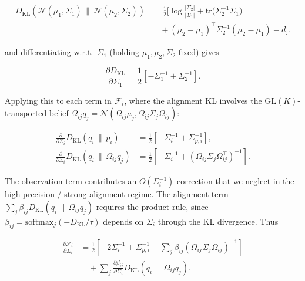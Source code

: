\documentclass[twoside,11pt]{article}
\begin{document}
\begin{align}
D_{\mathrm{KL}}\!\left(
\mathcal{N}(\mu_1, \Sigma_1)
\,\|\,
\mathcal{N}(\mu_2, \Sigma_2)
\right)
&=
\frac{1}{2}
\Big[
\log \frac{|\Sigma_2|}{|\Sigma_1|}
+ \mathrm{tr}\!\big(\Sigma_2^{-1}\Sigma_1\big)
\\ &\quad
+ (\mu_2 - \mu_1)^\top
  \Sigma_2^{-1}
  (\mu_2 - \mu_1)
- d
\Big].
\label{eq:gaussian_KL}
\end{align}


and differentiating w.r.t.\ $\Sigma_1$ (holding $\mu_1,\mu_2,\Sigma_2$ fixed) gives

\begin{equation}
\frac{\partial D_{\mathrm{KL}}}{\partial \Sigma_1}
=\frac{1}{2}\left[
-\Sigma_1^{-1}
+ \Sigma_2^{-1}
\right].
\end{equation}

Applying this to each term in $\mathcal{F}_i$, where the alignment KL involves the $\mathrm{GL}(K)$-transported belief $\Omega_{ij} q_j = \mathcal{N}(\Omega_{ij}\mu_j, \Omega_{ij}\Sigma_j\Omega_{ij}^\top)$:

\begin{align}
\frac{\partial}{\partial \Sigma_i}
D_{\mathrm{KL}}(q_i \,\|\, p_i)
&=\frac{1}{2}\left[
-\Sigma_i^{-1}
+ \Sigma_{p,i}^{-1}
\right],
\\[6pt]
\frac{\partial}{\partial \Sigma_i}
D_{\mathrm{KL}}(q_i \,\|\, \Omega_{ij} q_j)
&=
\frac{1}{2}\left[
-\Sigma_i^{-1}
+ (\Omega_{ij}\Sigma_j\Omega_{ij}^\top)^{-1}
\right].
\end{align}

The observation term contributes an $O(\Sigma_i^{-1})$ correction that we neglect in the high-precision / strong-alignment regime. The alignment term $\sum_j \beta_{ij} D_{\mathrm{KL}}(q_i \,\|\, \Omega_{ij} q_j)$ requires the product rule, since $\beta_{ij} = \mathrm{softmax}_j(-D_{\mathrm{KL}}/\tau)$ depends on $\Sigma_i$ through the KL divergence. Thus

\begin{equation}
\boxed{
\begin{aligned}
\frac{\partial \mathcal{F}_i}{\partial \Sigma_i}
&=\frac{1}{2}
\left[
-2 \Sigma_i^{-1}
+ \Sigma_{p,i}^{-1}
+ \sum_j \beta_{ij}
(\Omega_{ij}\Sigma_j\Omega_{ij}^\top)^{-1}
\right] \\
&\quad + \sum_j \frac{\partial \beta_{ij}}{\partial \Sigma_i}
D_{\mathrm{KL}}(q_i \,\|\, \Omega_{ij} q_j).
\end{aligned}
}
\label{eq:Sigma_gradient_final}
\end{equation}
\end{document}
